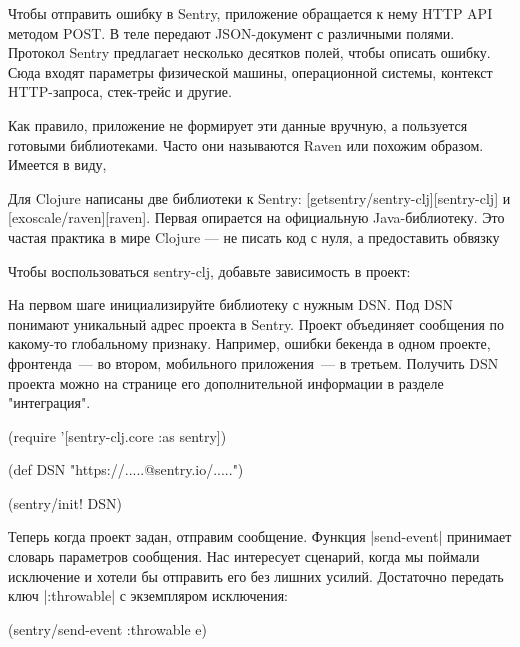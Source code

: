 Чтобы отправить ошибку в Sentry, приложение обращается к нему HTTP API методом
POST. В теле передают JSON-документ с различными полями. Протокол Sentry
предлагает несколько десятков полей, чтобы описать ошибку. Сюда входят параметры
физической машины, операционной системы, контекст HTTP-запроса, стек-трейс и
другие.

Как правило, приложение не формирует эти данные вручную, а пользуется готовыми
библиотеками. Часто они называются Raven или похожим образом. Имеется в виду,


Для Clojure написаны две библиотеки к Sentry: [getsentry/sentry-clj][sentry-clj]
и [exoscale/raven][raven]. Первая опирается на официальную Java-библиотеку. Это
частая практика в мире Clojure — не писать код с нуля, а предоставить обвязку

Чтобы воспользоваться sentry-clj, добавьте зависимость в проект:

\begin{code}
\end{code}

На первом шаге инициализируйте библиотеку с нужным DSN. Под DSN понимают
уникальный адрес проекта в Sentry. Проект объединяет сообщения по какому-то
глобальному признаку. Например, ошибки бекенда в одном проекте, фронтенда~--- во
втором, мобильного приложения~--- в третьем. Получить DSN проекта можно на
странице его дополнительной информации в разделе "интеграция".

\begin{code}
(require '[sentry-clj.core :as sentry])

(def DSN "https://.....@sentry.io/.....")

(sentry/init! DSN)
\end{code}

Теперь когда проект задан, отправим сообщение. Функция \spverb|send-event| принимает
словарь параметров сообщения. Нас интересует сценарий, когда мы поймали
исключение и хотели бы отправить его без лишних усилий. Достаточно передать ключ
\spverb|:throwable| с экземпляром исключения:

\begin{code}
(sentry/send-event {:throwable e})
\end{code}

